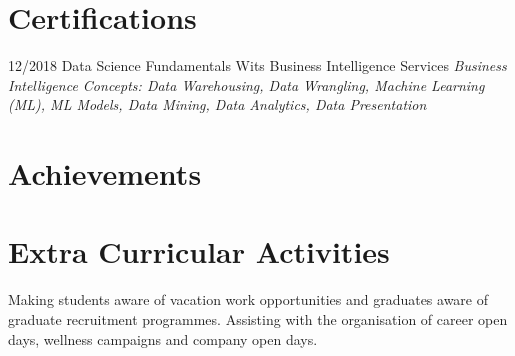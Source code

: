 \documentclass[]{friggeri-cv}
\begin{document}
\section{Certifications}
\begin{entrylist}
  \entry
    {12/2018}
    {Data Science Fundamentals}
    {Wits Business Intelligence Services}
    {\emph{Business Intelligence Concepts: Data Warehousing, Data Wrangling, Machine Learning (ML), ML Models, Data Mining, Data Analytics, Data Presentation}}
\end{entrylist}
\newpage
\section{Achievements}

\begin{entrylist}
    {\vspace{-0.2cm}}
\end{entrylist}

\section{Extra Curricular Activities}

\begin{entrylist}
    {Making students aware of vacation work opportunities and graduates aware of graduate recruitment programmes. Assisting with the organisation of career open days, wellness campaigns and company open days.}
\end{entrylist}
\end{document}
